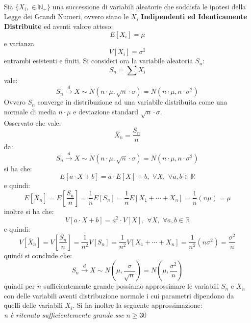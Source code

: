 \documentclass[a4paper,12pt, oneside]{book}
\newcommand{\numberset}{\mathbb}
\newcommand{\N}{\numberset{N}}
\newcommand{\R}{\numberset{R}}
\begin{document}
Sia $\{X_i,\in\N_+\}$ una successione di variabili aleatorie che soddisfa le ipotesi della Legge dei Grandi
Numeri, ovvero siano le $X_i$ \textbf{Indipendenti ed Identicamente Distribuite} ed aventi valore atteso:
\[E[X_i]=\mu\]
e varianza
\[V[X_i]=\sigma^2\]
entrambi esistenti e finiti. Si consideri ora la variabile aleatoria $S_n$:
\[S_n=\sum X_i\]
vale:
\[S_n\stackrel{d}{\longrightarrow}X\sim N(n\cdot\mu,\sqrt{n}\cdot \sigma)=N(n\cdot \mu, n\cdot \sigma^2)\]
Ovvero $S_n$ converge in distribuzione ad una variabile distribuita come una normale di media $n\cdot \mu$ e deviazione standard $\sqrt{n}\cdot \sigma$.\\
Osservato che vale:
\[\overline{X}_n=\frac{S_n}{n}\]
da:
\[S_n\stackrel{d}{\longrightarrow}X\sim N(n\cdot\mu,\sqrt{n}\cdot \sigma)=N(n\cdot \mu, n\cdot \sigma^2)\]
si ha che:
\[E[a\cdot X+b]=a\cdot E[X]+b,\,\, \forall X,\,\,\forall a,b\in\R\]
e quindi:
\[E[\overline{X}_n]=E\left[\frac{S_n}{n}\right]=\frac{1}{n}E[S_n]=\frac{1}{n}E[X_1+\cdots +X_n]=\frac{1}{n}(n\mu)=\mu\]
inoltre si ha che:
\[V[a\cdot X+b]=a^2\cdot V[X],\,\, \forall X,\,\,\forall a,b\in\R\]
e quindi:
\[V[\overline{X}_n]=V\left[\frac{S_n}{n}\right]=\frac{1}{n^2}V[S_n]=\frac{1}{n^2}V[X_1+\cdots+X_n]=\frac{1}{n^2}(n\sigma^2)=\frac{\sigma^2}{n}\]
quindi si conclude che:
\[S_n\stackrel{d}{\longrightarrow}X\sim N(\mu, \frac{\sigma}{\sqrt{n}})=N(\mu, \frac{\sigma^2}{n})\]
quindi per $n$ sufficientemente grande possiamo approssimare le variabili $S_n$ e $\overline{X}_n$ con delle variabili aventi distribuzione normale i cui parametri dipendono da quelli delle variabili $X_i$. Si ha inoltre la seguente approssimazione:\\
\textit{n è ritenuto sufficientemente grande sse $n\geq 30$}
\end{document}
